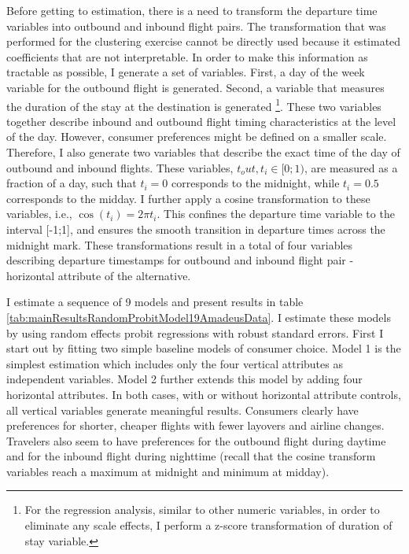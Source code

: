 \documentclass[a4paper,12pt]{article}
\begin{document}
Before getting to estimation, there is a need to transform the departure time variables into outbound and inbound flight pairs. The transformation that was performed for the clustering exercise cannot be directly used because it estimated coefficients that are not interpretable. In order to make this information as tractable as possible, I generate a set of variables. First, a day of the week variable for the outbound flight is generated. Second, a variable that measures the duration of the stay at the destination is generated \footnote{For the regression analysis, similar to other numeric variables, in order to eliminate any scale effects, I perform a z-score transformation of duration of stay variable.}.  These two variables together describe inbound and outbound flight timing characteristics at the level of the day. However, consumer preferences might be defined on a smaller scale. Therefore, I also generate two variables that describe the exact time of the day of outbound and inbound flights. These variables, $t_out,t_i \in [0;1)$, are measured as a fraction of a day, such that $t_i = 0$ corresponds to the midnight, while $t_i=0.5$ corresponds to the midday. I further apply a cosine transformation to these variables, i.e., $\cos(t_i ) = 2 \pi t_i$. This confines the departure time variable to the interval [-1;1], and ensures the smooth transition in departure times across the midnight mark.  These transformations result in a total of four variables describing departure timestamps for outbound and inbound flight pair - horizontal attribute of the alternative.

I estimate a sequence of 9 models and present results in table \ref{tab:mainResultsRandomProbitModel19AmadeusData}. I estimate these models by using random effects probit regressions  with robust standard errors. First I start out by fitting two simple baseline models of consumer choice. Model 1 is the simplest estimation which includes only the four vertical attributes as independent variables. Model 2 further extends this model by adding four horizontal attributes. In both cases, with or without horizontal attribute controls, all vertical variables generate meaningful results. Consumers clearly have preferences for shorter, cheaper flights with fewer layovers and airline changes. Travelers also seem to have preferences for the outbound flight during daytime and for the inbound flight during nighttime (recall that the cosine transform variables reach a maximum at midnight and minimum at midday).
\end{document}
